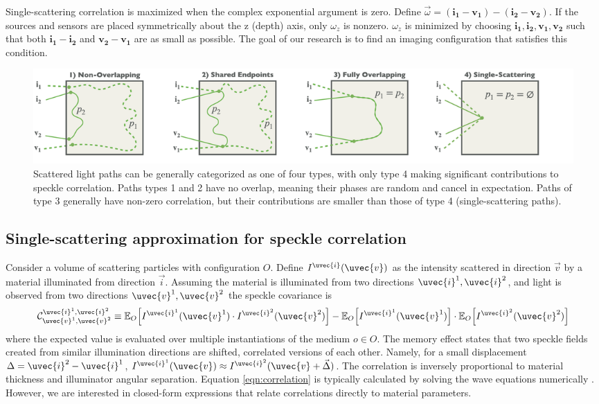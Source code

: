 Single-scattering correlation is maximized when the complex exponential argument is zero. Define $\vec{\omega} = (\mathbf{i_1} - \mathbf{v_1}) - (\mathbf{i_2} - \mathbf{v_2})$. If the sources and sensors are placed symmetrically about the z (depth) axis, only $\omega_z$ is nonzero. $\omega_z$ is minimized by choosing $\mathbf{i_1,i_2,v_1,v_2}$ such that both $\mathbf{i_1} - \mathbf{i_2}$ and $\mathbf{v_2} - \mathbf{v_1}$ are as small as possible. The goal of our research is to find an imaging configuration that satisfies this condition.
%
\begin{figure}
    \centering
    \includegraphics[width=\textwidth]{../figures/path_types.png}
    \caption{Scattered light paths can be generally categorized as one of four types, with only type 4 making significant contributions to speckle correlation. Paths types 1 and 2 have no overlap, meaning their phases are random and cancel in expectation. Paths of type 3 generally have non-zero correlation, but their contributions are smaller than those of type 4 (single-scattering paths).}
    \label{fig:path_types}
\end{figure}

\subsection{Single-scattering approximation for speckle correlation}
Consider a volume of scattering particles with configuration $O$. Define $I^{\uvec{i}}(\uvec{v})$ as the intensity scattered in direction $\vec{v}$ by a material illuminated from direction $\vec{i}$. Assuming the material is illuminated from two directions $\uvec{i}^1, \uvec{i}^2$, and light is observed from two directions $\uvec{v}^1, \uvec{v}^2$ the speckle covariance is
%
\begin{equation}
    \mathcal{C}_{\uvec{v}^1,\uvec{v}^2}^{\uvec{i}^1,\uvec{i}^2} \equiv \mathbb{E}_O\Big[I^{\uvec{i}^1}(\uvec{v}^1) \cdot I^{\uvec{i}^2}(\uvec{v}^2)\Big] - \mathbb{E}_O\Big[I^{\uvec{i}^1}(\uvec{v}^1)\Big] \cdot \mathbb{E}_O\Big[I^{\uvec{i}^2}(\uvec{v}^2)\Big]
    \label{eqn:correlation}
\end{equation}
%
where the expected value is evaluated over multiple instantiations of the medium $o \in O$.
The memory effect states that two speckle fields created from similar illumination directions are shifted, correlated versions of each other. Namely, for a small displacement $\Delta = \uvec{i}^2 - \uvec{i}^1$, $I^{\uvec{i}^1}(\uvec{v}) \approx I^{\uvec{i}^2}(\uvec{v} + \vec{\Delta})$. The correlation is inversely proportional to material thickness and illuminator angular separation. Equation \ref{eqn:correlation} is typically calculated by solving the wave equations numerically \cite{thierry2015mu, treeby2010k, yee1966numerical}. However, we are interested in closed-form expressions that relate correlations directly to material parameters.

